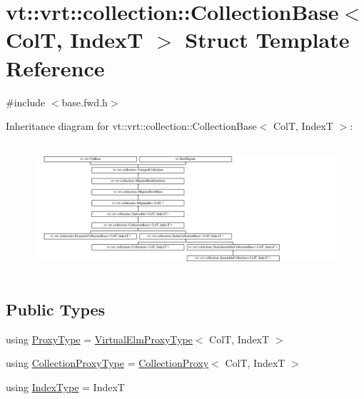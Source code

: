 \hypertarget{structvt_1_1vrt_1_1collection_1_1_collection_base}{}\section{vt\+:\+:vrt\+:\+:collection\+:\+:Collection\+Base$<$ ColT, IndexT $>$ Struct Template Reference}
\label{structvt_1_1vrt_1_1collection_1_1_collection_base}


{\ttfamily \#include $<$base.\+fwd.\+h$>$}

Inheritance diagram for vt\+:\+:vrt\+:\+:collection\+:\+:Collection\+Base$<$ ColT, IndexT $>$\+:\begin{figure}[H]
\begin{center}
\leavevmode
\includegraphics[height=4.873803cm]{structvt_1_1vrt_1_1collection_1_1_collection_base}
\end{center}
\end{figure}
\subsection*{Public Types}
\begin{DoxyCompactItemize}
\item 
using \hyperlink{structvt_1_1vrt_1_1collection_1_1_collection_base_a0c2fd2443732bebc963f6278b7ba089b}{Proxy\+Type} = \hyperlink{namespacevt_1_1vrt_a620a5c8c59d13e513f690c74b4af516f}{Virtual\+Elm\+Proxy\+Type}$<$ ColT, IndexT $>$
\item 
using \hyperlink{structvt_1_1vrt_1_1collection_1_1_collection_base_af40b40a2ee128748bcb917f14a0152b4}{Collection\+Proxy\+Type} = \hyperlink{structvt_1_1vrt_1_1collection_1_1_collection_proxy}{Collection\+Proxy}$<$ ColT, IndexT $>$
\item 
using \hyperlink{structvt_1_1vrt_1_1collection_1_1_collection_base_ac1fbcd7655ac53ee681964cee23c5d1e}{Index\+Type} = IndexT
\end{DoxyCompactItemize}
